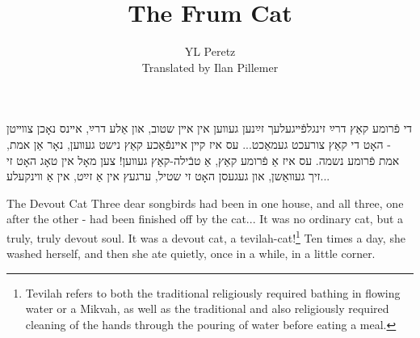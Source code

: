 \documentclass{book}
\begin{document}
\title{The Frum Cat}
\author{YL Peretz\\Translated by Ilan Pillemer}
\date{}

\maketitle
\begin{pairs}

\begin{Rightside}
\begin{RTL}
\begin{hebrew}
\beginnumbering
\pstart
די פֿרומע קאַץ
\newline
\pend
\pstart
דרײַ זינגלפֿײגעלעך זײַנען געװען אין אײן שטוב, און אַלע דרײַ, אײנס נאָכן צװײטן - האָט די קאַץ צורעכט געמאַכט...
\pend
\pstart
עס איז קײן אײנפֿאַכע קאַץ נישט געװען, נאָר אַן אמת, אמת פֿרומע נשמה.
\pend
\pstart
עס איז אַ פֿרומע קאַץ, אַ טבֿילה-קאַץ געװען! צען מאָל אין טאָג האָט זי זיך געװאַשן, און געגעסן האָט זי שטיל, ערגעץ אין אַ זײַט, אין אַ װינקעלע...
\pend
\endnumbering
\end{hebrew}
\end{RTL}
\end{Rightside}




\begin{Leftside}
\begin{english}
\beginnumbering
\pstart
The Devout Cat
\newline
\pend
\pstart
Three dear songbirds had been in one house, and all three, one after the other - had been finished off by the cat...
\pend
\pstart
It was no ordinary cat, but a truly, truly devout soul. \newline
\pend
\pstart
It was a devout cat, a tevilah-cat!\footnote{Tevilah refers to both the traditional religiously required bathing in flowing water or a Mikvah, as well as the traditional and also religiously required cleaning of the hands through the pouring of water before eating a meal.} 
Ten times a day, she washed herself, and then she ate quietly, once in a while, in a little corner.  
\pend
\endnumbering
\end{english}
\end{Leftside}

\end{pairs}
\Columns
\end{document}
